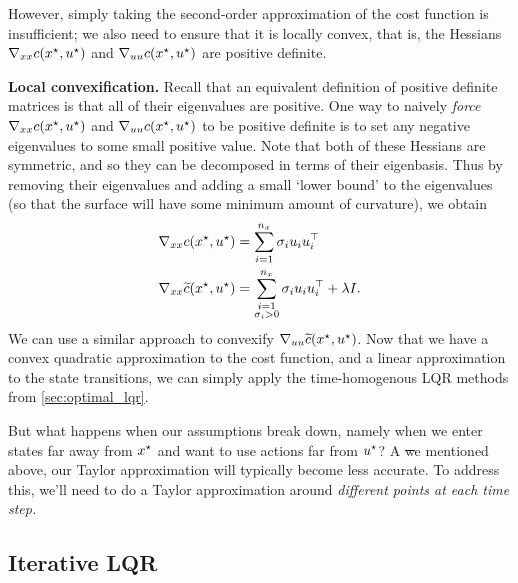 \documentclass[../main/main]{subfiles}
\begin{document}
However, simply taking the second-order approximation of the cost function is insufficient;
we also need to ensure that it is locally convex, that is, the Hessians $\nabla_{x x} c(x^\star, u^\star)$ and $\nabla_{u u} c(x^\star, u^\star)$ are positive definite.

\textbf{Local convexification.} Recall that an equivalent definition of positive definite matrices is that all of their eigenvalues are positive. One way to naively \emph{force} $\nabla_{x x} c(x^\star, u^\star)$ and $\nabla_{u u} c(x^\star, u^\star)$ to be positive definite is to set any negative eigenvalues to some small positive value.
Note that both of these Hessians are symmetric, and so they can be decomposed in terms of their eigenbasis. Thus by removing their eigenvalues and adding a small `lower bound' to the eigenvalues (so that the surface will have some minimum amount of curvature), we obtain
\begin{align*}
    \nabla_{x x} c(x^\star, u^\star) &= \sum_{i=1}^{n_x} \sigma_i u_i u_i^\top \\
    \nabla_{x x} \widetilde c(x^\star, u^\star) &= \sum_{\substack{i=1 \\ \sigma_i > 0}}^{n_x} \sigma_i u_i u_i^\top + \lambda I.
\end{align*}
We can use a similar approach to convexify $\nabla_{u u} \widetilde{c}(x^\star, u^\star)$. Now that we have a convex quadratic approximation to the cost function, and a linear approximation to the state transitions, we can simply apply the time-homogenous LQR methods from \autoref{sec:optimal_lqr}.


But what happens when our assumptions break down, namely when we enter states far away from $x^\star$ and want to use actions far from $u^\star$?
A \st we mentioned above, our Taylor approximation will typically become less accurate.
To address this, we'll need to do a Taylor approximation around \emph{different points at each time step.}

\subsection{Iterative LQR}
\end{document}
